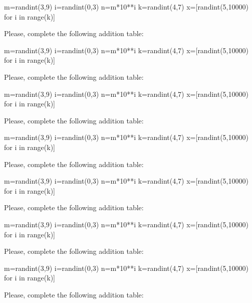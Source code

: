 \documentclass{ximera}
\begin{document}
\begin{problem}
\begin{sagesilent}
m=randint(3,9)
i=randint(0,3)
n=m*10**i
k=randint(4,7)
x=[randint(5,10000) for i in range(k)]
\end{sagesilent}
Please, complete the following addition table:
\end{problem}

\begin{problem}
\begin{sagesilent}
m=randint(3,9)
i=randint(0,3)
n=m*10**i
k=randint(4,7)
x=[randint(5,10000) for i in range(k)]
\end{sagesilent}
Please, complete the following addition table:
\end{problem}


\begin{problem}
\begin{sagesilent}
m=randint(3,9)
i=randint(0,3)
n=m*10**i
k=randint(4,7)
x=[randint(5,10000) for i in range(k)]
\end{sagesilent}
Please, complete the following addition table:
\end{problem}


\begin{problem}
\begin{sagesilent}
m=randint(3,9)
i=randint(0,3)
n=m*10**i
k=randint(4,7)
x=[randint(5,10000) for i in range(k)]
\end{sagesilent}
Please, complete the following addition table:
\end{problem}
\begin{problem}
\begin{sagesilent}
m=randint(3,9)
i=randint(0,3)
n=m*10**i
k=randint(4,7)
x=[randint(5,10000) for i in range(k)]
\end{sagesilent}
Please, complete the following addition table:
\end{problem}

\begin{problem}
\begin{sagesilent}
m=randint(3,9)
i=randint(0,3)
n=m*10**i
k=randint(4,7)
x=[randint(5,10000) for i in range(k)]
\end{sagesilent}
Please, complete the following addition table:
\end{problem}

\begin{problem}
\begin{sagesilent}
m=randint(3,9)
i=randint(0,3)
n=m*10**i
k=randint(4,7)
x=[randint(5,10000) for i in range(k)]
\end{sagesilent}
Please, complete the following addition table:
\end{problem}
\end{document}
